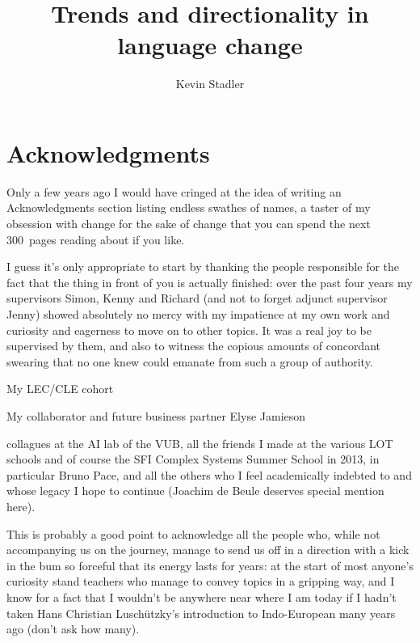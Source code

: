 \documentclass[oneside]{book}
\author{Kevin Stadler}
\title{Trends and directionality in language change}
\begin{document}
\maketitle


\tableofcontents

\listoffigures
\listoftables

\chapter*{Acknowledgments}

Only a few years ago I would have cringed at the idea of writing an Acknowledgments section listing endless swathes of names, a taster of my obsession with change for the sake of change that you can spend the next 300~pages reading about if you like.

I guess it's only appropriate to start by thanking the people responsible for the fact that the thing in front of you is actually finished: over the past four years my supervisors Simon, Kenny and Richard (and not to forget adjunct supervisor Jenny) showed absolutely no mercy with my impatience at my own work and curiosity and eagerness to move on to other topics. It was a real joy to be supervised by them, and also to witness the copious amounts of concordant swearing that no one knew could emanate from such a group of authority.

My LEC/CLE cohort

My collaborator and future business partner Elyse Jamieson %

collagues at the AI lab of the VUB, all the friends I made at the various LOT schools and of course the SFI Complex Systems Summer School in 2013, in particular Bruno Pace, and all the others who I feel academically indebted to and whose legacy I hope to continue (Joachim de Beule deserves special mention here).

This is probably a good point to acknowledge all the people who, while not accompanying us on the journey, manage to send us off in a direction with a kick in the bum so forceful that its energy lasts for years: at the start of most anyone's curiosity stand teachers who manage to convey topics in a gripping way, and I know for a fact that I wouldn't be anywhere near where I am today if I hadn't taken Hans Christian Luschützky's introduction to Indo-European many years ago (don't ask how many).
\end{document}
